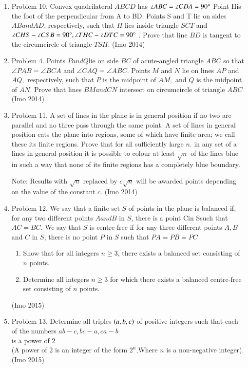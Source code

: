 \begin{enumerate}
\item Problem 10. Convex quadrilateral $ABCD$ has $\angle ABC= \angle CDA = 90 \degree$ Point His the foot of the perpendicular from A to BD. Points S and T lie on sides $AB and AD$, respectively, such that $H$ lies inside triangle $SCT$ and $\angle CHS- \angle CSB = 90 \degree , \angle THC- \angle DTC = 90\degree$ .
	Prove that line $BD$ is tangent to the circumcircle of triangle $TSH$. \hfill(Imo 2014)
\item Problem 4. Points $P and Q$lie on side $BC$ of acute-angled triangle $ABC$ so that $\angle PAB= \angle BCA$ and $\angle CAQ=\angle ABC.$ Points $M$ and $N$ lie on lines $AP$ and $AQ,$ respectively, such that $P$ is the midpoint of $AM,$ and $Q$ is the midpoint of $AN.$ Prove that lines $BM and CN$ intersect on circumcircle of triangle $ABC$ \hfill(Imo 2014)
\item Problem 11. A set of lines in the plane is in general position if no two are parallel and no three pass through the same point. A set of lines in general position cats the plane into regions, some of which have finite area; we call these its finite regions. Prove that for all sufficiently large $n$. in any set of a lines in general position it is possible to colour at least $\sqrt n$ of the lines blue in such a way that none of its finite regions has a completely blue boundary.

	Note: Results with $\sqrt n$ replaced by $c \sqrt n$  will be awarded points depending on the value of the constant $c$. \hfill(Imo 2014)
	
\item Problem 12. We say that a finite set $S$ of points in the plane is balanced if, for any two different points $A and B$ in $S$, there is a point Cin Ssuch that $AC=BC$. We say that $S$ is centre-free if for any three different points $A, B$ and $C$ in $S$, there is no point $P$ in $S$ such that $PA=PB=PC$
	\begin{enumerate} 

\item  Show that for all integers $n\geq3$, there exists a balanced set consisting of $n$ points.

\item  Determine all integers $n\geq3$ for which there exists a balanced centre-free set consisting of $n$ points.
	\end{enumerate}	\hfill(Imo 2015)	
	
\item Problem 13. Determine all triples $\left(a, b, c\right)$ of positive integers such that each of the numbers
			 $ ab-c, bc-a,ca-b$\\
		is a  power of $2$\\(A power of 2 is an integer of the form $2^n$,Where $n$ is a non-negative integer). \hfill(Imo 2015)
		

\end{enumerate}
